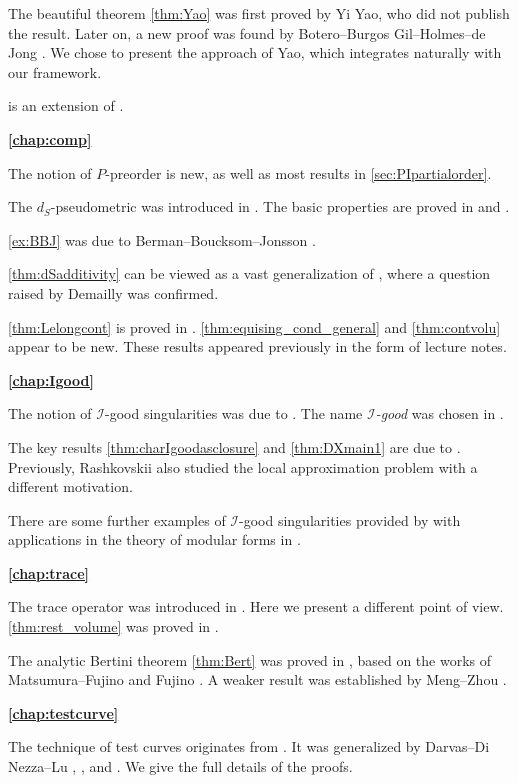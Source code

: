 The beautiful theorem \cref{thm:Yao} was first proved by Yi Yao, who did not publish the result. Later on, a new proof was found by Botero--Burgos Gil--Holmes--de Jong \cite{BBGHdJ21}. We chose to present the approach of Yao, which integrates naturally with our framework.

 is an extension of \cite[Proposition~2.9]{BB13}.

\textbf{\cref{chap:comp}}

The notion of $P$-preorder is new, as well as most results in \cref{sec:PIpartialorder}.

The $d_S$-pseudometric was introduced in \cite{DDNLmetric}. The basic properties are proved in \cite{DDNLmetric} and \cite{Xia21}.

\cref{ex:BBJ} was due to Berman--Boucksom--Jonsson \cite{BBJ21}.

\cref{thm:dSadditivity} can be viewed as a vast generalization of \cite{Cao15}, where a question raised by Demailly was confirmed.

\cref{thm:Lelongcont} is proved in \cite{Xia22}. \cref{thm:equising_cond_general} and \cref{thm:contvolu} appear to be new. These results appeared previously in the form of lecture notes.

\textbf{\cref{chap:Igood}}

The notion of $\mathcal{I}$-good singularities was due to \cite{DX21}. The name \emph{$\mathcal{I}$-good} was chosen in \cite{Xia22}.


The key results \cref{thm:charIgoodasclosure} and \cref{thm:DXmain1} are due to \cite{DX21, DX22}. Previously, Rashkovskii \cite{Ra13} also studied the local approximation problem with a different motivation.

There are some further examples of $\mathcal{I}$-good singularities provided by \cite{BBGHdJ21} with applications in the theory of modular forms in \cite{BBGHdJ22}.

\textbf{\cref{chap:trace}}

The trace operator was introduced in \cite{DX24}. Here we present a different point of view. \cref{thm:rest_volume} was proved in \cite{DX24}.

The analytic Bertini theorem \cref{thm:Bert} was proved in \cite{XiaBer}, based on the works of Matsumura--Fujino \cite{FM21} and Fujino \cite{Fuj23}. A weaker result was established by Meng--Zhou \cite{MZ23}.


\textbf{\cref{chap:testcurve}}

The technique of test curves originates from \cite{RWN14}. It was generalized by Darvas--Di Nezza--Lu \cite{DDNL18big}, \cite{DX21}, \cite{DZ22} and \cite{DXZ23}.
We give the full details of the proofs.


